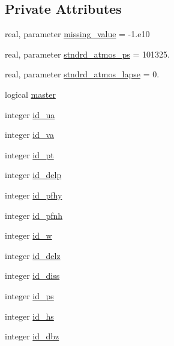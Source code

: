 \subsection*{Private Attributes}
\begin{DoxyCompactItemize}
\item 
real, parameter \hyperlink{classfv__nggps__diags__mod_ae58ca0a4c6f6a924fe1ad700c59e7835}{missing\-\_\-value} = -\/1.e10
\item 
real, parameter \hyperlink{classfv__nggps__diags__mod_a67f209631191a0c270db5c26d5613683}{stndrd\-\_\-atmos\-\_\-ps} = 101325.
\item 
real, parameter \hyperlink{classfv__nggps__diags__mod_ac448721091d8e09234e09b5e3e4d0d68}{stndrd\-\_\-atmos\-\_\-lapse} = 0.
\item 
logical \hyperlink{classfv__nggps__diags__mod_a1cd9085200009db10173487afdf6107c}{master}
\item 
integer \hyperlink{classfv__nggps__diags__mod_aa33d7dc926260a8a41cb7c5c4952c7ee}{id\-\_\-ua}
\item 
integer \hyperlink{classfv__nggps__diags__mod_aafff421203a7bb0b275df42417272314}{id\-\_\-va}
\item 
integer \hyperlink{classfv__nggps__diags__mod_ad1c08702435f095c18a06e1070a607f7}{id\-\_\-pt}
\item 
integer \hyperlink{classfv__nggps__diags__mod_aec07245665ff3463d2c2801eae6706b7}{id\-\_\-delp}
\item 
integer \hyperlink{classfv__nggps__diags__mod_a714a8b91e9583fc54a76401abf6c942f}{id\-\_\-pfhy}
\item 
integer \hyperlink{classfv__nggps__diags__mod_a807900a4b82994c01e0a4da6bea37cac}{id\-\_\-pfnh}
\item 
integer \hyperlink{classfv__nggps__diags__mod_aefe549069cacd0721fdc4c5c3d266743}{id\-\_\-w}
\item 
integer \hyperlink{classfv__nggps__diags__mod_a905a7d18ebee5090090ae09da236114f}{id\-\_\-delz}
\item 
integer \hyperlink{classfv__nggps__diags__mod_ad4a684d38a9581ad8102dc39d1fe5879}{id\-\_\-diss}
\item 
integer \hyperlink{classfv__nggps__diags__mod_ad1d89db3f69ad85f97da253ceb8591b2}{id\-\_\-ps}
\item 
integer \hyperlink{classfv__nggps__diags__mod_ab67fd10f74cfab0898427bbc86b30245}{id\-\_\-hs}
\item 
integer \hyperlink{classfv__nggps__diags__mod_a230a7e07e841292812b5e02aaa2b4b25}{id\-\_\-dbz}

\end{DoxyCompactItemize}
